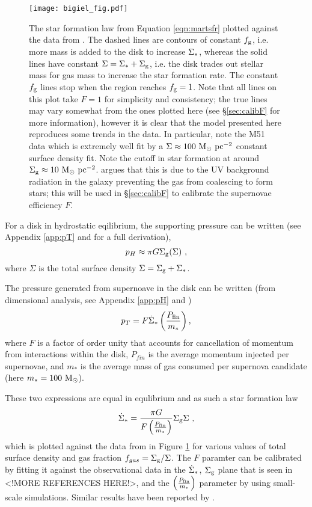 \begin{figure}
    \centering
    \texttt{[image: bigiel\_fig.pdf]}
    \caption{The star formation law from Equation \ref{eqn:martsfr} plotted against the data from \citet{bigiel_star_2008}. The dashed lines are contours of constant $f_\mathrm{g}$, i.e. more mass is added to the disk to increase $\Sigma_*$, whereas the solid lines have constant $\Sigma = \Sigma_* + \Sigma_\mathrm{g}$, i.e. the disk trades out stellar mass for gas mass to increase the star formation rate. The constant $f_\mathrm{g}$ lines stop when the region reaches $f_\mathrm{g}=1$. Note that all lines on this plot take $F=1$ for simplicity and consistency; the true lines may vary somewhat from the ones plotted here (see \S \ref{sec:calibF} for more information), however it is clear that the model presented here reproduces some trends in the data. In particular, note the M51 data which is extremely well fit by a $\Sigma \approx 100 ~\mathrm{M}_{\odot} ~\mathrm{pc}^{-2}$ constant surface density fit. Note the cutoff in star formation at around $\Sigma_\mathrm{g} \approx 10 ~\mathrm{M}_{\odot} ~\mathrm{pc}^{-2}$. \citet{schaye_star_2004} argues that this is due to the UV background radiation in the galaxy preventing the gas from coalescing to form stars; this will be used in \S \ref{sec:calibF} to calibrate the supernovae efficiency $F$.}
    \label{fig:bigielwithmart}
\end{figure}

For a disk in hydrostatic eqilibrium, the supporting pressure can be written (see Appendix \ref{app:pT} and \citet{ostriker_maximally_2011} for a full derivation),
\begin{equation}
\label{eqn:hydeq}
p_H \approx \pi G \Sigma_\mathrm{g} (\Sigma)~,
\end{equation}
where $\Sigma$ is the total surface density $\Sigma = \Sigma_\mathrm{g} + \Sigma_*$.

The pressure generated from supernoave in the disk can be written (from dimensional analysis, see Appendix \ref{app:pH} and \citet{martizzi_supernova_2015})
\begin{equation}
\label{eqn:turb}
p_T = F \dot{\Sigma}_* \left(\frac{P_\mathrm{fin}}{m_*}\right),
\end{equation}
where $F$ is a factor of order unity that accounts for cancellation of momentum from interactions within the disk, $P_{fin}$ is the average momentum injected per supernovae, and $m_*$ is the average mass of gas consumed per supernova candidate (here $m_* = 100 ~\mathrm{M}_{\odot}$).

These two expressions are equal in equlibrium and as such a star formation law
\begin{equation}
\label{eqn:martsfr}
\dot{\Sigma}_* = \frac{\pi G}{F \left(\frac{P_\mathrm{fin}}{m_*}\right)} \Sigma_\mathrm{g} \Sigma~,
\end{equation}
which is plotted against the data from \citet{bigiel_star_2008} in Figure \ref{fig:bigielwithmart} for various values of total surface density and gas fraction $f_{gas} = \Sigma_\mathrm{g}/\Sigma$.
The $F$ paramter can be calibrated by fitting it against the observational data in the $\dot{\Sigma}_*$, $\Sigma_\mathrm{g}$ plane that is seen in \citet{bigiel_star_2008} <!MORE REFERENCES HERE!>, and the $\left(\frac{P_\mathrm{fin}}{m_*}\right)$ parameter by using small-scale simulations.
Similar results have been reported by \citep{ostriker_maximally_2011}.
